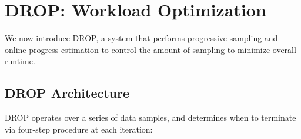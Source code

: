 \section{DROP: Workload Optimization}
\label{sec:algo}

We now introduce DROP, a system that performs progressive sampling and online progress estimation to control the amount of sampling to minimize overall runtime. 

\subsection{DROP Architecture}
\label{subsec:arch}
DROP operates over a series of data samples, and determines when to terminate via  four-step procedure at each iteration: %


